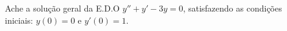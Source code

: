 \linespread{1.5}
Ache a solução geral da E.D.O $y'' + y' - 3y = 0$, satisfazendo as condições iniciais:
$y(0) = 0$ e $y'(0) = 1$.